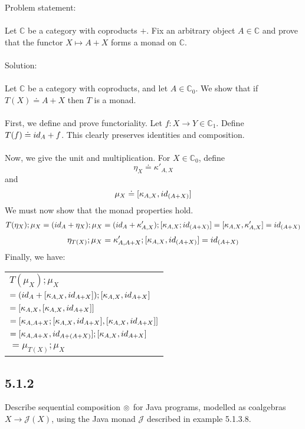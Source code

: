 \documentclass{article}
\begin{document}
Problem statement:\\~\\
Let $\mathbb C$ be a category with coproducts $+$. Fix an arbitrary object $A \in \mathbb C$ and
prove that the functor $X \mapsto A + X$ forms a monad on $\mathbb C$.\\~\\
Solution:\\~\\
Let $\mathbb C$ be a category with coproducts, and let $A \in \mathbb C_0$.
We show that if $T(X) \doteq A + X$ then $T$ is a monad.\\~\\
First, we define and prove functoriality. Let $f : X \to Y \in \mathbb C_1$. Define $T(f) \doteq \mit{id}_A + f$.
This clearly preserves identities and composition.\\~\\
Now, we give the unit and multiplication. For $X \in \mathbb C_0$, define 
$$ \eta_X \doteq \kappa'_{A,X}$$
and
$$ \mu_X \doteq [\kappa_{A,X}, \mit{id}_{(A+X)}]$$
We must now show that the monad properties hold.
$$T(\eta_X);\mu_X = (\mit{id}_A + \eta_X);\mu_X = (\mit{id}_A + \kappa'_{A,X});[\kappa_{A,X};\mit{id}_{(A+X)}]=[\kappa_{A,X}, \kappa'_{A,X}] = \mit{id}_{(A+X)}$$
$$\eta_{T(X)};\mu_X = \kappa'_{A,A+X};[\kappa_{A,X}, \mit{id}_{(A+X)}] = \mit{id}_{(A+X)}$$
Finally, we have:
\begin{center}
\begin{tabular}{l}
$T(\mu_X);\mu_X$ \\
$= (\mit{id}_A + [\kappa_{A,X} , \mit{id}_{A +X}]);[\kappa_{A,X}, \mit{id}_{A+X}]$ \\
$= [\kappa_{A,X}, [\kappa_{A,X},\mit{id}_{A+X}]]$ \\
$= [\kappa_{A,A+X};[\kappa_{A,X} , \mit{id}_{A+X}], [\kappa_{A,X}, \mit{id}_{A+X}]]$ \\
$= [\kappa_{A,A+X}, \mit{id}_{A + (A + X)}];[\kappa_{A,X}, \mit{id}_{A + X}]$ \\
$= \mu_{T(X)};\mu_X$
\end{tabular}
\end{center}

\subsection*{5.1.2}

Describe sequential composition $\ocircle$ for Java programs, modelled as coalgebras $X \to \mathcal J(X)$, using the
Java monad $\mathcal J$ described in example 5.1.3.8.
\end{document}
